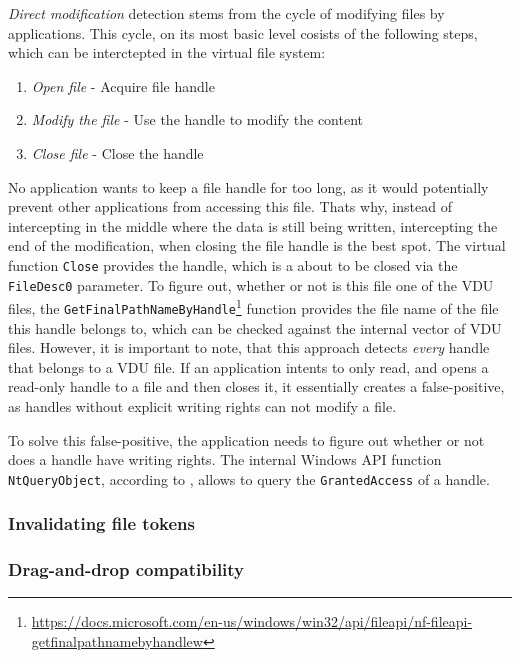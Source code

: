 \textit{Direct modification} detection stems from the cycle of modifying files by applications. This cycle, on its most basic level cosists of the following steps, which can be interctepted in the virtual file system:
\begin{enumerate}
    \item \textit{Open file} - Acquire file handle
    \item \textit{Modify the file} - Use the handle to modify the content
    \item \textit{Close file} - Close the handle
\end{enumerate}
No application wants to keep a file handle for too long, as it would potentially prevent other applications from accessing this file. Thats why, instead of intercepting in the middle where the data is still being written, intercepting the end of the modification, when closing the file handle is the best spot. 
The virtual function \lstinline{Close} provides the handle, which is a about to be closed via the \lstinline{FileDesc0} parameter. To figure out, whether or not is this file one of the VDU files, the \lstinline{GetFinalPathNameByHandle}\footnote{\url{https://docs.microsoft.com/en-us/windows/win32/api/fileapi/nf-fileapi-getfinalpathnamebyhandlew}} function provides the file name of the file this handle belongs to, which can be checked against the internal vector of VDU files. However, it is important to note, that this approach detects \textit{every} handle that belongs to a VDU file. If an application intents to only read, and opens a read-only handle to a file and then closes it, it essentially creates a false-positive, as handles without explicit writing rights can not modify a file.

To solve this false-positive, the application needs to figure out whether or not does a handle have writing rights. The internal Windows API function \lstinline{NtQueryObject}, according to \cite{WinNtQuery}, allows to query the \lstinline{GrantedAccess} of a handle. 

\subsubsection{Invalidating file tokens}

\subsubsection{Drag-and-drop compatibility}

